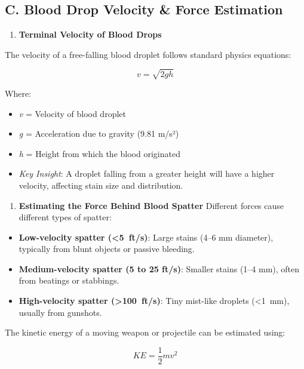 \documentclass[11pt]{article}
\providecommand{\tightlist}{%
      \setlength{\itemsep}{0pt}\setlength{\parskip}{0pt}}
\begin{document}
\subsection{C. Blood Drop Velocity \& Force
Estimation}\label{c.-blood-drop-velocity-force-estimation}

\begin{enumerate}
\def\labelenumi{\arabic{enumi}.}
\tightlist
\item
  \textbf{Terminal Velocity of Blood Drops}
\end{enumerate}

The velocity of a free-falling blood droplet follows standard physics
equations:

\[v=\sqrt{2gh}\]

Where:

\begin{itemize}
\item
  \emph{v} = Velocity of blood droplet
\item
  \emph{g} = Acceleration due to gravity (9.81 m/s²)
\item
  \emph{h} = Height from which the blood originated
\item
  \emph{Key Insight}: A droplet falling from a greater height will have
  a higher velocity, affecting stain size and distribution.
\end{itemize}

\begin{enumerate}
\def\labelenumi{\arabic{enumi}.}
\setcounter{enumi}{1}
\tightlist
\item
  \textbf{Estimating the Force Behind Blood Spatter} Different forces
  cause different types of spatter:
\end{enumerate}

\begin{itemize}
\tightlist
\item
  \textbf{Low-velocity spatter (\textless5~ft/s)}: Large stains (4--6 mm
  diameter), typically from blunt objects or passive bleeding.
\item
  \textbf{Medium-velocity spatter (5 to 25 ft/s)}: Smaller stains (1--4
  mm), often from beatings or stabbings.
\item
  \textbf{High-velocity spatter (\textgreater100~ft/s)}: Tiny mist-like
  droplets (\textless1~mm), usually from gunshots.
\end{itemize}

The kinetic energy of a moving weapon or projectile can be estimated
using:

\[KE=\frac{1}{2}mv^2\]
\end{document}
